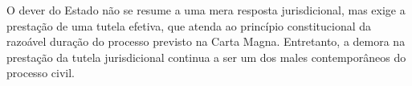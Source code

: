 O dever do Estado não se resume a uma mera resposta jurisdicional, mas exige a prestação de uma tutela efetiva, que atenda ao princípio constitucional da razoável duração do processo previsto na Carta Magna. Entretanto, a demora na prestação da tutela jurisdicional continua a ser um dos males contemporâneos do processo civil.